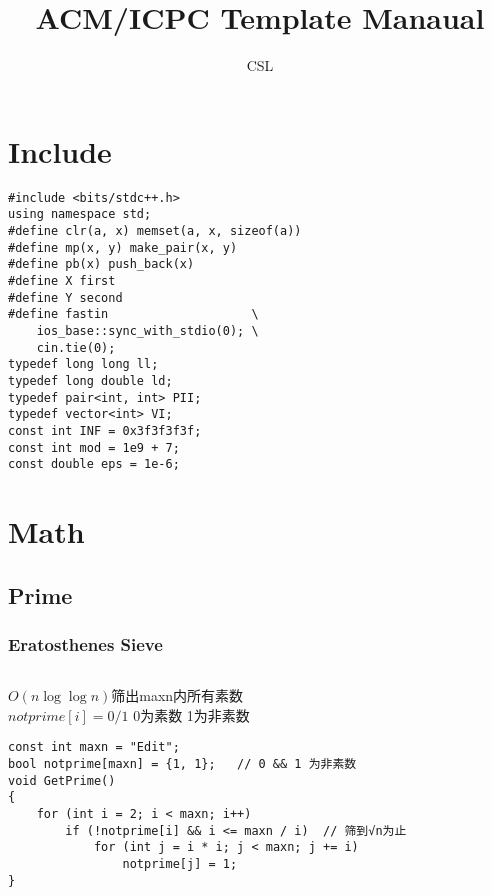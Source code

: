 \documentclass[twoside]{article}
\title{ACM/ICPC Template Manaual}
\author{CSL}
\begin{document}
\small
\begin{titlepage}
\maketitle\setcounter{page}{0}\thispagestyle{empty}\clearpage
\end{titlepage}
\tableofcontents\clearpage
\pagestyle{fancy}
\lfoot{}
\cfoot{\thepage}\rfoot{}
\setcounter{section}{-1}
\setcounter{page}{1}
\clearpage\section{Include}
\begin{lstlisting}
#include <bits/stdc++.h>
using namespace std;
#define clr(a, x) memset(a, x, sizeof(a))
#define mp(x, y) make_pair(x, y)
#define pb(x) push_back(x)
#define X first
#define Y second
#define fastin                    \
    ios_base::sync_with_stdio(0); \
    cin.tie(0);
typedef long long ll;
typedef long double ld;
typedef pair<int, int> PII;
typedef vector<int> VI;
const int INF = 0x3f3f3f3f;
const int mod = 1e9 + 7;
const double eps = 1e-6;
\end{lstlisting}
\clearpage\section{Math}
\subsection{Prime}
\subsubsection{Eratosthenes Sieve}
\begin{lstlisting}
\end{lstlisting}
$O(n\log\log n)$筛出maxn内所有素数\\
$notprime[i] = 0/1$ 0为素数 1为非素数\\
\begin{lstlisting}
const int maxn = "Edit";
bool notprime[maxn] = {1, 1};   // 0 && 1 为非素数
void GetPrime()
{
    for (int i = 2; i < maxn; i++)
        if (!notprime[i] && i <= maxn / i)  // 筛到√n为止
            for (int j = i * i; j < maxn; j += i)
                notprime[j] = 1;
}
\end{lstlisting}
\end{document}
